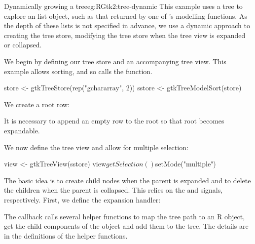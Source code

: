 \begin{example}{Dynamically growing a tree}{eg:RGtk2:tree-dynamic}
This example uses a tree to explore an \R\/ list object, such as that
returned by one of \R's modelling functions.  As the depth of these
lists is not specified in advance, we use a dynamic approach to
creating the tree store, modifying the tree store when the tree view
is expanded or collapsed.
  

We begin by defining our tree store and an accompanying tree
view. This example allows sorting, and so calls the
 function.
\begin{Schunk}
\begin{Sinput}
 store <- gtkTreeStore(rep("gchararray", 2))
 sstore <- gtkTreeModelSort(store)
\end{Sinput}
\end{Schunk}

We create a root row:
\begin{Schunk}
\end{Schunk}
%
It is necessary to append an empty row to the root so that root
becomes expandable.

We now define the tree view and allow for multiple selection:
\begin{Schunk}
\begin{Sinput}
 view <- gtkTreeView(sstore)
 view$getSelection()$setMode("multiple")
\end{Sinput}
\end{Schunk}

The basic idea is to create child nodes when the parent is expanded
and to delete the children when the parent is collapsed. This relies
on the  and  signals,
respectively. First, we define the expansion handler:
\begin{Schunk}
\end{Schunk}
%
The callback calls several helper functions to map the tree path to an
R object, get the child components of the object and add them to the
tree. The details are in the definitions of the helper functions.


\end{example}
